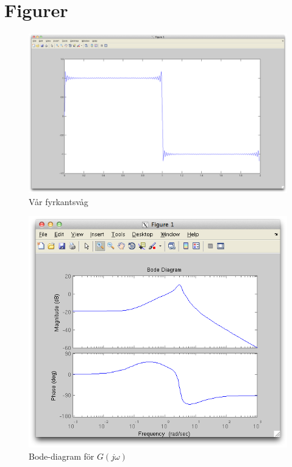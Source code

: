 \documentclass[]{article}
\begin{document}
\section{Figurer} %
\label{sec:figurer}
\begin{figure}[hbt]
  \centering
  \includegraphics[width=15.0cm]{square.png}
  \caption{Vår fyrkantsvåg}
\end{figure}
\begin{figure}[hbt]
  \centering
  \includegraphics[width=15.0cm]{bode.png}
  \caption{Bode-diagram för $G(j\omega)$}
\end{figure}
\end{document}
